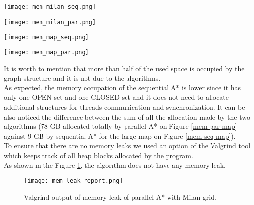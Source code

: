 \begin{center}
    \begin{minipage}[b]{0.45\textwidth}
        \texttt{[image: mem\_milan\_seq.png]}
        \label{mem-seq-milan}
    \end{minipage}
    \hspace{0.5cm}
    \begin{minipage}[b]{0.45\textwidth}
        \texttt{[image: mem\_milan\_par.png]}
        \label{mem-par-milan}
    \end{minipage}%
    
    \vspace{0.5cm}
    
    \begin{minipage}[b]{0.45\textwidth}
        \texttt{[image: mem\_map\_seq.png]}
        \label{mem-seq-map}
    \end{minipage}%
    \hspace{0.5cm}
    \begin{minipage}[b]{0.45\textwidth}
        \texttt{[image: mem\_map\_par.png]}
        \label{mem-par-map}
    \end{minipage}

\end{center}
It is worth to mention that more than half of the used space is occupied by the graph structure and it is not due to the algorithms.
\\
As expected, the memory occupation of the sequential A* is lower since it has only one OPEN set and one CLOSED set and it does not need to allocate additional structures for threads communication and synchronization.
It can be also noticed the difference between the sum of all the allocation made by the two algorithms (78 GB allocated totally by parallel A* on Figure \ref{mem-par-map} against 9 GB by sequential A* for the large map on Figure \ref{mem-seq-map}).
\\
To ensure that there are no memory leaks we used an option of the Valgrind tool which keeps track of all heap blocks allocated by the program.
\\
As shown in the Figure \ref{mem-leak-milan}, the algorithm does not have any memory leak.

\begin{figure}[h]
    \centering
    \texttt{[image: mem\_leak\_report.png]}
    \caption{Valgrind output of memory leak of parallel A* with Milan grid.}
    \label{mem-leak-milan}
\end{figure}



